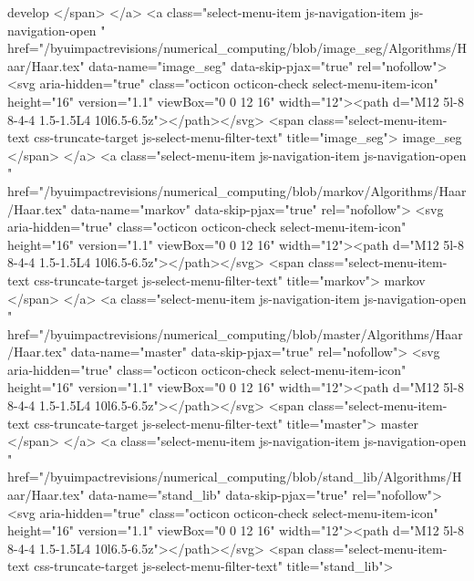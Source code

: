                 develop
              </span>
            </a>
            <a class="select-menu-item js-navigation-item js-navigation-open "
               href="/byuimpactrevisions/numerical_computing/blob/image_seg/Algorithms/Haar/Haar.tex"
               data-name="image_seg"
               data-skip-pjax="true"
               rel="nofollow">
              <svg aria-hidden="true" class="octicon octicon-check select-menu-item-icon" height="16" version="1.1" viewBox="0 0 12 16" width="12"><path d="M12 5l-8 8-4-4 1.5-1.5L4 10l6.5-6.5z"></path></svg>
              <span class="select-menu-item-text css-truncate-target js-select-menu-filter-text" title="image_seg">
                image_seg
              </span>
            </a>
            <a class="select-menu-item js-navigation-item js-navigation-open "
               href="/byuimpactrevisions/numerical_computing/blob/markov/Algorithms/Haar/Haar.tex"
               data-name="markov"
               data-skip-pjax="true"
               rel="nofollow">
              <svg aria-hidden="true" class="octicon octicon-check select-menu-item-icon" height="16" version="1.1" viewBox="0 0 12 16" width="12"><path d="M12 5l-8 8-4-4 1.5-1.5L4 10l6.5-6.5z"></path></svg>
              <span class="select-menu-item-text css-truncate-target js-select-menu-filter-text" title="markov">
                markov
              </span>
            </a>
            <a class="select-menu-item js-navigation-item js-navigation-open "
               href="/byuimpactrevisions/numerical_computing/blob/master/Algorithms/Haar/Haar.tex"
               data-name="master"
               data-skip-pjax="true"
               rel="nofollow">
              <svg aria-hidden="true" class="octicon octicon-check select-menu-item-icon" height="16" version="1.1" viewBox="0 0 12 16" width="12"><path d="M12 5l-8 8-4-4 1.5-1.5L4 10l6.5-6.5z"></path></svg>
              <span class="select-menu-item-text css-truncate-target js-select-menu-filter-text" title="master">
                master
              </span>
            </a>
            <a class="select-menu-item js-navigation-item js-navigation-open "
               href="/byuimpactrevisions/numerical_computing/blob/stand_lib/Algorithms/Haar/Haar.tex"
               data-name="stand_lib"
               data-skip-pjax="true"
               rel="nofollow">
              <svg aria-hidden="true" class="octicon octicon-check select-menu-item-icon" height="16" version="1.1" viewBox="0 0 12 16" width="12"><path d="M12 5l-8 8-4-4 1.5-1.5L4 10l6.5-6.5z"></path></svg>
              <span class="select-menu-item-text css-truncate-target js-select-menu-filter-text" title="stand_lib">
